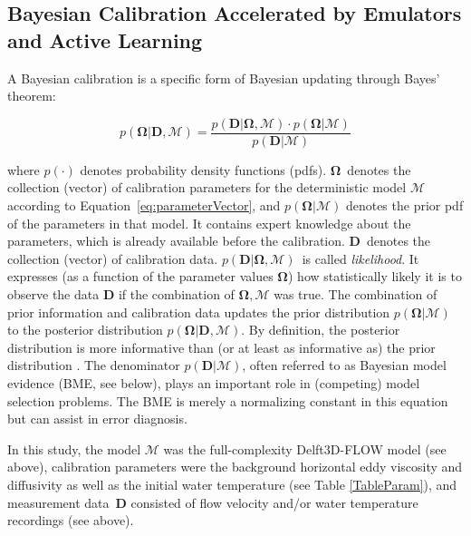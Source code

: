 \documentclass[draft,linenumbers,onecolumn]{agujournal2019} %
\begin{document}
\subsection{Bayesian Calibration Accelerated by Emulators and Active Learning}
\label{sec:bayesCal}

A Bayesian calibration is a specific form of Bayesian updating through Bayes' theorem:

\begin{equation}
	p\left( \mathbf{\Omega} \vert \mathbf{D},\mathcal{M} \right) = \frac{p\left( \mathbf{D} \vert \mathbf{\Omega},\mathcal{M} \right) \cdot p\left( \mathbf{\Omega}\vert \mathcal{M}\right) }{p\left( \mathbf{D}\vert\mathcal{M}\right) }
	\label{eq:Bayes}
\end{equation}

where $p(\cdot)$ denotes probability density functions (pdfs). $\mathbf{\Omega}$~denotes the collection (vector) of calibration parameters for the deterministic model $\mathcal{M}$ according to Equation~\ref{eq:parameterVector}, and $p(\mathbf{\Omega} | \mathcal{M})$ denotes the prior pdf of the parameters in that model. It contains expert knowledge about the parameters, which is already available before the calibration. $\mathbf{D}$~denotes the collection (vector) of calibration data. $p(\mathbf{D} | \mathbf{\Omega} , \mathcal{M})$~is called \textit{likelihood}. It expresses (as a function of the parameter values $\mathbf{\Omega}$) how statistically likely it is to observe the data $\mathbf{D}$ if the combination of $\mathbf{\Omega},\mathcal{M}$ was true. The combination of prior information and calibration data updates the prior distribution $p(\mathbf{\Omega}|\mathcal{M})$ to the posterior distribution $p(\mathbf{\Omega} \vert \mathbf{D},\mathcal{M})$. By definition, the posterior distribution is more informative than (or at least as informative as) the prior distribution \cite{box_bayesian_1973, oladyshkin_connection_2019}. The denominator $p(\mathbf{D}|\mathcal{M})$, often referred to as Bayesian model evidence (BME, see below), plays an important role in (competing) model selection problems. The BME is merely a normalizing constant in this equation but can assist in error diagnosis.

In this study, the model $\mathcal{M}$ was the full-complexity Delft3D-FLOW model (see above), calibration parameters were the background horizontal eddy viscosity and diffusivity as well as the initial water temperature (see Table \ref{TableParam}), and measurement data~$\mathbf{D}$ consisted of flow velocity and/or water temperature recordings (see above).
\end{document}
